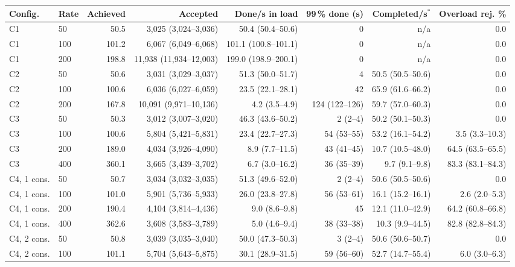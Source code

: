 \begin{tabular}{llrrrrrr}
\toprule
Config. & Rate & Achieved & Accepted & Done/s in load & 99\,\% done (s) & Completed/s$^{*}$ & Overload rej. \% \\
\midrule
C1 & 50 & 50.5 & 3,025 (3,024--3,036) & 50.4 (50.4--50.6) & 0 & n/a & 0.0 \\
C1 & 100 & 101.2 & 6,067 (6,049--6,068) & 101.1 (100.8--101.1) & 0 & n/a & 0.0 \\
C1 & 200 & 198.8 & 11,938 (11,934--12,003) & 199.0 (198.9--200.1) & 0 & n/a & 0.0 \\
\addlinespace[2pt]
C2 & 50 & 50.6 & 3,031 (3,029--3,037) & 51.3 (50.0--51.7) & 4 & 50.5 (50.5--50.6) & 0.0 \\
C2 & 100 & 100.6 & 6,036 (6,027--6,059) & 23.5 (22.1--28.1) & 42 & 65.9 (61.6--66.2) & 0.0 \\
C2 & 200 & 167.8 & 10,091 (9,971--10,136) & 4.2 (3.5--4.9) & 124 (122--126) & 59.7 (57.0--60.3) & 0.0 \\
\addlinespace[2pt]
C3 & 50 & 50.3 & 3,012 (3,007--3,020) & 46.3 (43.6--50.2) & 2 (2--4) & 50.2 (50.1--50.3) & 0.0 \\
C3 & 100 & 100.6 & 5,804 (5,421--5,831) & 23.4 (22.7--27.3) & 54 (53--55) & 53.2 (16.1--54.2) & 3.5 (3.3--10.3) \\
C3 & 200 & 189.0 & 4,034 (3,926--4,090) & 8.9 (7.7--11.5) & 43 (41--45) & 10.7 (10.5--48.0) & 64.5 (63.5--65.5) \\
C3 & 400 & 360.1 & 3,665 (3,439--3,702) & 6.7 (3.0--16.2) & 36 (35--39) & 9.7 (9.1--9.8) & 83.3 (83.1--84.3) \\
\addlinespace[2pt]
C4, 1 cons. & 50 & 50.7 & 3,034 (3,032--3,035) & 51.3 (49.6--52.0) & 2 (2--4) & 50.6 (50.5--50.6) & 0.0 \\
C4, 1 cons. & 100 & 101.0 & 5,901 (5,736--5,933) & 26.0 (23.8--27.8) & 56 (53--61) & 16.1 (15.2--16.1) & 2.6 (2.0--5.3) \\
C4, 1 cons. & 200 & 190.4 & 4,104 (3,814--4,436) & 9.0 (8.6--9.8) & 45 & 12.1 (11.0--42.9) & 64.2 (60.8--66.8) \\
C4, 1 cons. & 400 & 362.6 & 3,608 (3,583--3,789) & 5.0 (4.6--9.4) & 38 (33--38) & 10.3 (9.9--44.5) & 82.8 (82.8--84.3) \\
\addlinespace[2pt]
C4, 2 cons. & 50 & 50.8 & 3,039 (3,035--3,040) & 50.0 (47.3--50.3) & 3 (2--4) & 50.6 (50.6--50.7) & 0.0 \\
C4, 2 cons. & 100 & 101.1 & 5,704 (5,643--5,875) & 30.1 (28.9--31.5) & 59 (56--60) & 52.7 (14.7--55.4) & 6.0 (3.0--6.3) \\

\end{tabular}
